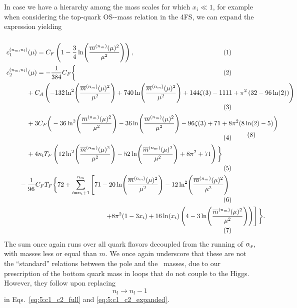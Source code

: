 In case we have a hierarchy among the mass scales for which $x_i \ll 1$, for example when considering the top-quark \acs{OS}-\MS-mass relation in the 4\acs{FS}, we can expand the expression yielding
\begin{equation}
\resizebox{\textwidth}{!}{
\begin{minipage}{\textwidth}
\begin{align*}
c_1^{(n_m, n_l)}(&\mu) = C_F \left(1 -\frac{3}{4} \ln\! \left(\frac{\overline{m}^{(n_m)}(\mu)^2}{\mu^2} \right) \right), \\
c_2^{(n_m, n_l)}(&\mu) = -\frac{1}{384} C_F \bigg \lbrace \\
&\hspace{-0.2cm} + C_A \left(-132 \ln^2\!\left(\frac{\overline{m}^{(n_m)}(\mu)^2}{\mu^2} \right) +740 \ln\! \left(\frac{\overline{m}^{(n_m)}(\mu)^2}{\mu^2} \right) +144 \zeta (3)-1111+\pi ^2 \left( 32-96 \ln (2) \right) \right) \\
& \hspace{-0.2cm} +3 C_F \bigg(-36 \ln^2\! \left(\frac{\overline{m}^{(n_m)}(\mu)^2}{\mu^2} \right) -36 \ln\! \left(\frac{\overline{m}^{(n_m)}(\mu)^2}{\mu^2} \right) -96 \zeta (3)+71+8 \pi ^2 (8 \ln (2)-5)\bigg) \\
& \hspace{-0.2cm} +4 n_l T_F\left(12 \ln^2\! \left( \frac{\overline{m}^{(n_m)}(\mu)^2}{\mu^2} \right) -52 \ln\! \left( \frac{\overline{m}^{(n_m)}(\mu)^2}{\mu^2} \right) +8 \pi ^2+71\right) \bigg \rbrace \\
& \hspace{-0.6cm}   - \frac{1}{96} C_F T_F \bigg \lbrace 72  +  \sum_{i = n_l + 1}^{n_m}  \left[71 - 20 \ln\! \left( \frac{\overline{m}^{(n_m)}(\mu)^2}{\mu^2} \right) - 12 \ln^2\! \left( \frac{\overline{m}^{(n_m)}(\mu)^2}{\mu^2} \right) \right. \\
&\hspace{4cm} \left. + 8 \pi^2 (1 - 3 x_i) + 16 \ln (x_i) \left(4 - 3 \ln\! \left( \frac{\overline{m}^{(n_m)}(\mu)^2}{\mu^2} \right) \right) \right] \bigg \rbrace.
\end{align*}
\end{minipage}
}
\refstepcounter{equation}
\tag{\theequation} \label{eq:5:c1_c2_expanded}
\end{equation}
The sum once again runs over all quark flavors decoupled from the running of $\alpha_s$, with masses less or equal than $m$. We once again underscore that these are not the ``standard'' relations between the pole and the \MS\ masses, due to our prescription of the bottom quark mass in loops that do not couple to the Higgs. However, they follow upon replacing
\begin{equation}
n_l \longrightarrow n_l - 1
\end{equation}
in Eqs.~\eqref{eq:5:c1_c2_full} and \eqref{eq:5:c1_c2_expanded}.

